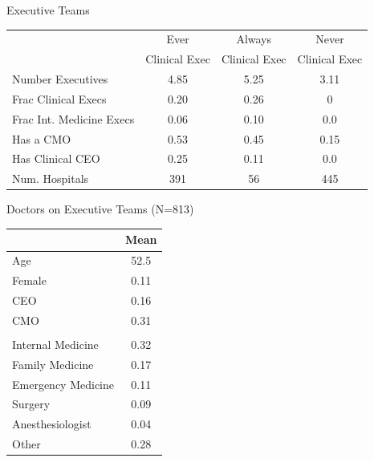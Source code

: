 \documentclass[notes,11pt, aspectratio=169]{beamer}
\begin{document}
\begin{frame}{Executive Teams}
    \begin{table}[ht!]
        \centering
        \begin{tabular}[t]{lccc}
        \toprule
         & Ever & Always & Never\\
         & Clinical Exec & Clinical Exec &  Clinical Exec \\
        \midrule
        Number Executives & 4.85 & 5.25 & 3.11\\
        Frac Clinical Execs & 0.20 & 0.26 & 0\\
        Frac Int. Medicine Execs & 0.06 & 0.10 & 0.0\\
        Has a CMO & 0.53 & 0.45 & 0.15\\
        Has Clinical CEO & 0.25 & 0.11 & 0.0\\
        \addlinespace[0.6em]
        Num. Hospitals & 391 & 56 & 445\\
        \bottomrule
        \end{tabular}
    \end{table}
\end{frame}

\begin{frame}{Doctors on Executive Teams (N=813)}
    \begin{table}[ht!]
    \centering
    \begin{tabular}[t]{p{6cm} c}
    \toprule
     & Mean\\
    \midrule
    Age & 52.5\\
    Female & 0.11\\
    CEO & 0.16\\
    CMO & 0.31\\
    \addlinespace[0.3em]
    \multicolumn{2}{l}{\textbf{Specialty}}\\
    \hspace{1em}Internal Medicine & 0.32\\
    \hspace{1em}Family Medicine & 0.17\\
    \hspace{1em}Emergency Medicine & 0.11\\
    \hspace{1em}Surgery & 0.09\\
    \hspace{1em}Anesthesiologist & 0.04\\
    \hspace{1em}Other & 0.28\\
    \bottomrule
    \end{tabular}
    \end{table}
\end{frame}
\end{document}
